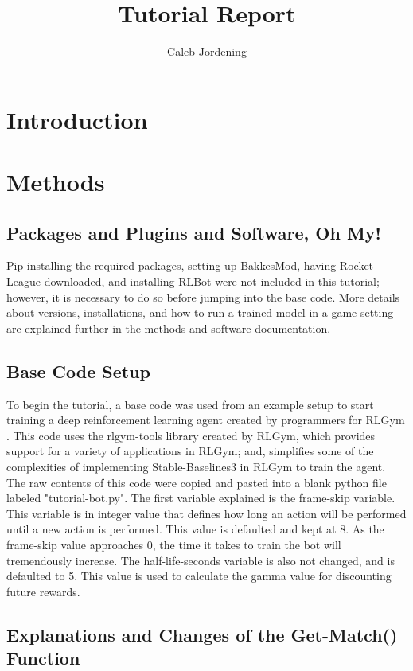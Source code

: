 \documentclass[10pt,twocolumn]{article}
\title{Tutorial Report}
\author{Caleb Jordening}
\affiliation{Occidental College}
\begin{document}
\maketitle


\section{Introduction}


\section{Methods}

\subsection{Packages and Plugins and Software, Oh My!}
Pip installing the required packages, setting up BakkesMod, having Rocket League downloaded, and installing RLBot were not included in this tutorial; however, it is necessary to do so before jumping into the base code. More details about versions, installations, and how to run a trained model in a game setting are explained further in the methods and software documentation.

\subsection{Base Code Setup}
To begin the tutorial, a base code was used from an example setup to start training a deep reinforcement learning agent created by programmers for RLGym \cite{github}. This code uses the rlgym-tools library created by RLGym, which provides support for a variety of applications in RLGym; and, simplifies some of the complexities of implementing Stable-Baselines3 in RLGym to train the agent. The raw contents of this code were copied and pasted into a blank python file labeled "tutorial-bot.py". The first variable explained is the frame-skip variable. This variable is in integer value that defines how long an action will be performed until a new action is performed. This value is defaulted and kept at 8. As the frame-skip value approaches 0, the time it takes to train the bot will tremendously increase. The half-life-seconds variable is also not changed, and is defaulted to 5. This value is used to calculate the gamma value for discounting future rewards.

\subsection{Explanations and Changes of the Get-Match() Function}
\end{document}
